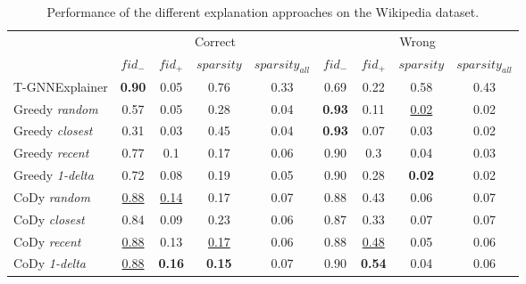 \begin{table}[ht]
    \centering
    \begin{tabular}{lcccccccc}
    \hline
         &  \multicolumn{4}{c}{Correct}&  \multicolumn{4}{c}{Wrong}\\
         &  $fid_-$&  $fid_+$&  $sparsity$&  $sparsity_{all}$&  $fid_-$&  $fid_+$&  $sparsity$&  $sparsity_{all}$\\
         \hline
         T-GNNExplainer&  \textbf{0.90}&  0.05&  0.76&  0.33&  0.69&  0.22&  0.58&  0.43\\
         Greedy \textit{random}&  0.57&  0.05&  0.28& 0.04&  \textbf{0.93}&  0.11&  \underline{0.02}&  0.02\\
         Greedy \textit{closest}&  0.31&  0.03&  0.45&  0.04&  \textbf{0.93}&  0.07&  0.03&  0.02\\
         Greedy \textit{recent}&  0.77&  0.1&  0.17&  0.06&  0.90&  0.3&  0.04&  0.03\\
 Greedy \textit{1-delta}& 0.72& 0.08& 0.19& 0.05& 0.90& 0.28& \textbf{0.02}& 0.02\\
 CoDy \textit{random}& \underline{0.88}& \underline{0.14}& 0.17& 0.07& 0.88& 0.43& 0.06& 0.07\\
 CoDy \textit{closest}& 0.84& 0.09& 0.23& 0.06& 0.87& 0.33& 0.07& 0.07\\
 CoDy \textit{recent}& \underline{0.88}& 0.13& \underline{0.17}& 0.06& 0.88& \underline{0.48}& 0.05& 0.06\\
 CoDy \textit{1-delta}& \underline{0.88}& \textbf{0.16}& \textbf{0.15}& 0.07& 0.90& \textbf{0.54}& 0.04& 0.06\\
 \hline
    \end{tabular}
    \caption{Performance of the different explanation approaches on the Wikipedia dataset.}
    \label{t_results_wikipedia_overview}
\end{table}

